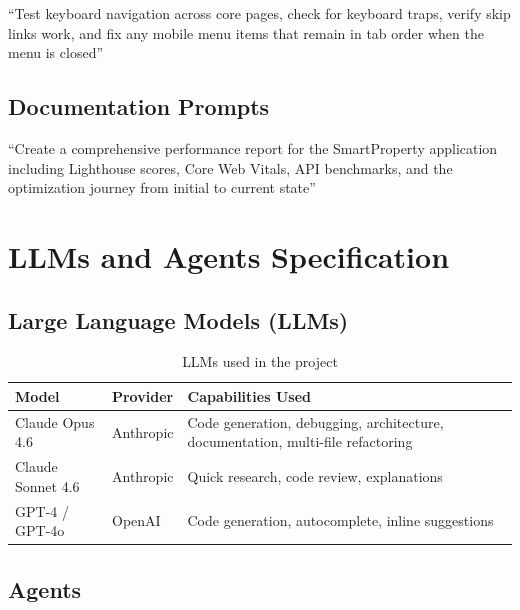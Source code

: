 \documentclass[12pt,a4paper]{article}
\begin{document}
\begin{promptbox}
``Test keyboard navigation across core pages, check for keyboard traps, verify skip links work, and fix any mobile menu items that remain in tab order when the menu is closed''
\end{promptbox}

\subsection{Documentation Prompts}

\begin{promptbox}
``Create a comprehensive performance report for the SmartProperty application including Lighthouse scores, Core Web Vitals, API benchmarks, and the optimization journey from initial to current state''
\end{promptbox}

\section{LLMs and Agents Specification}

\subsection{Large Language Models (LLMs)}

\begin{table}[H]
\centering
\begin{tabularx}{\textwidth}{llX}
\toprule
\textbf{Model} & \textbf{Provider} & \textbf{Capabilities Used} \\
\midrule
Claude Opus 4.6    & Anthropic & Code generation, debugging, architecture, documentation, multi-file refactoring \\
Claude Sonnet 4.6  & Anthropic & Quick research, code review, explanations \\
GPT-4 / GPT-4o    & OpenAI    & Code generation, autocomplete, inline suggestions \\
\bottomrule
\end{tabularx}
\caption{LLMs used in the project}
\end{table}

\subsection{Agents}
\end{document}
